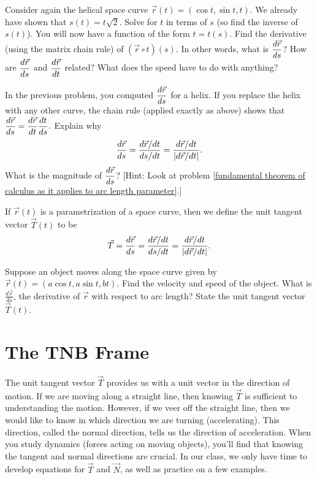 \begin{problem}
 Consider again the helical space curve $\vec r(t)=(\cos t, \sin t, t)$.  We already have shown that $s(t) = t\sqrt{2}$. Solve for $t$ in terms of $s$ (so find the inverse of $s(t)$). You will now have a function of the form $t=t(s)$.  Find the derivative (using the matrix chain rule) of $(\vec r\circ t)(s)$. In other words, what is $\displaystyle\frac{d\vec r}{ds}$? How are $\displaystyle\frac{d\vec r}{ds}$  and $\displaystyle\frac{d\vec r}{dt}$ related?  What does the speed have to do with anything?
\end{problem}

\begin{problem}%
In the previous problem, you computed $\displaystyle\frac{d\vec r}{ds}$ for a helix. If you replace the helix with any other curve, the chain rule (applied exactly as above) shows that $\displaystyle\frac{d\vec r}{ds} = \frac{d\vec r}{dt}\frac{dt}{ds}.$
Explain why $$\displaystyle\frac{d\vec r}{ds} =\displaystyle\frac{d\vec r/dt}{ds/dt} = \frac{d\vec r/dt}{|d\vec r/dt|}.$$
What is the magnitude of $\displaystyle\frac{d\vec r}{ds}$? 
[Hint: Look at problem \ref{fundamental theorem of calculus as it applies to arc length parameter}.] 
\end{problem}


\begin{definition}\label{def unit tangent vector}
 If $\vec r(t)$ is a parametrization of a space curve, then we define the unit tangent vector $\vec T(t)$ to be 
$$\vec T = \displaystyle\frac{d\vec r}{ds}=\displaystyle\frac{d\vec r/dt}{ds/dt} = \frac{d\vec r/dt}{|d \vec r/dt|}.$$
\end{definition}

\begin{problem}
%
 Suppose an object moves along the space curve given by  $\vec r(t)=(a\cos t,a\sin t,b t)$. Find the velocity and speed of the object. What is $\frac{d\vec r}{ds}$, the derivative of $\vec r$ with respect to arc length?  State the unit tangent vector $\vec T(t)$.
\end{problem}

\section{The TNB Frame}
The unit tangent vector $\vec T$ provides us with a unit vector in the direction of motion. If we are moving along a straight line, then knowing $\vec T$ is sufficient to understanding the motion.  However, if we veer off the straight line, then we would like to know in which direction we are turning (accelerating).  This direction, called the normal direction, tells us the direction of acceleration. When you study dynamics (forces acting on moving objects), you'll find that knowing the tangent and normal directions are crucial. In our class, we only have time to develop equations for $\vec T$ and $\vec N$, as well as practice on a few examples. 


